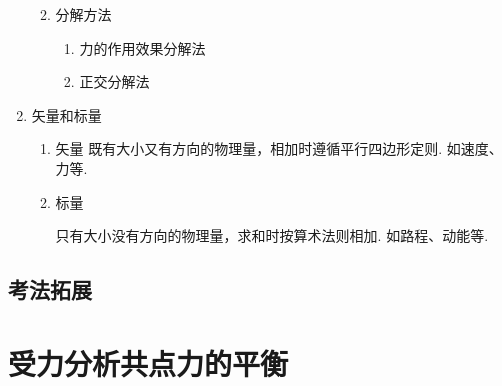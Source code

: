 \documentclass[cn,11pt]{elegantbook}
\begin{document}
\begin{enumerate}
\begin{enumerate}
\begin{enumerate}
            \end{enumerate}
            \item 分解方法
            \begin{enumerate}
               \item 力的作用效果分解法
               \item 正交分解法
               
            \end{enumerate}
            
         \end{enumerate}
         \item 矢量和标量
         \begin{enumerate}
            \item 矢量
            既有大小又有方向的物理量，相加时遵循平行四边形定则. 如速度、力等.
               
            \item 标量
            
            只有大小没有方向的物理量，求和时按算术法则相加. 如路程、动能等.
         \end{enumerate}
         
      \end{enumerate}
      \subsection{考法拓展}

   \section{受力分析共点力的平衡}
\end{document}
